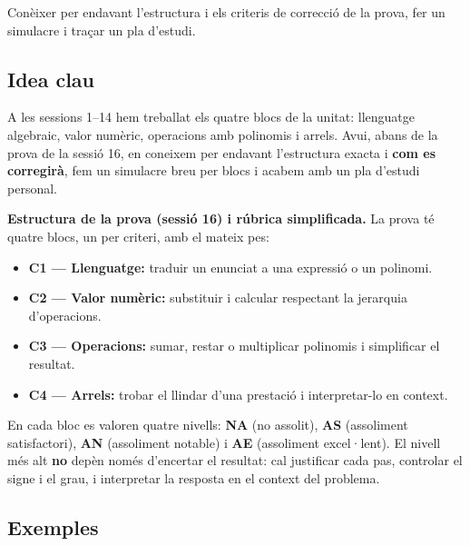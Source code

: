 %
{Conèixer per endavant l'estructura i els criteris de correcció de la prova, fer un simulacre i traçar un pla d'estudi.}

\subsection{Idea clau}

A les sessions 1–14 hem treballat els quatre blocs de la unitat: llenguatge
algebraic, valor numèric, operacions amb polinomis i arrels. Avui, abans de
la prova de la sessió 16, en coneixem per endavant l'estructura exacta i
\textbf{com es corregirà}, fem un simulacre breu per blocs i acabem amb un
pla d'estudi personal.

\begin{idea}
\textbf{Estructura de la prova (sessió 16) i rúbrica simplificada.}
La prova té quatre blocs, un per criteri, amb el mateix pes:
\begin{itemize}[leftmargin=1.4em, itemsep=2pt]
  \item \textbf{C1 — Llenguatge:} traduir un enunciat a una expressió o
        un polinomi.
  \item \textbf{C2 — Valor numèric:} substituir i calcular respectant la
        jerarquia d'operacions.
  \item \textbf{C3 — Operacions:} sumar, restar o multiplicar polinomis i
        simplificar el resultat.
  \item \textbf{C4 — Arrels:} trobar el llindar d'una prestació i
        interpretar-lo en context.
\end{itemize}
En cada bloc es valoren quatre nivells: \textbf{NA} (no assolit),
\textbf{AS} (assoliment satisfactori), \textbf{AN} (assoliment notable) i
\textbf{AE} (assoliment excel·lent). El nivell més alt \textbf{no} depèn
només d'encertar el resultat: cal justificar cada pas, controlar el signe
i el grau, i interpretar la resposta en el context del problema.
\end{idea}

\subsection{Exemples}

